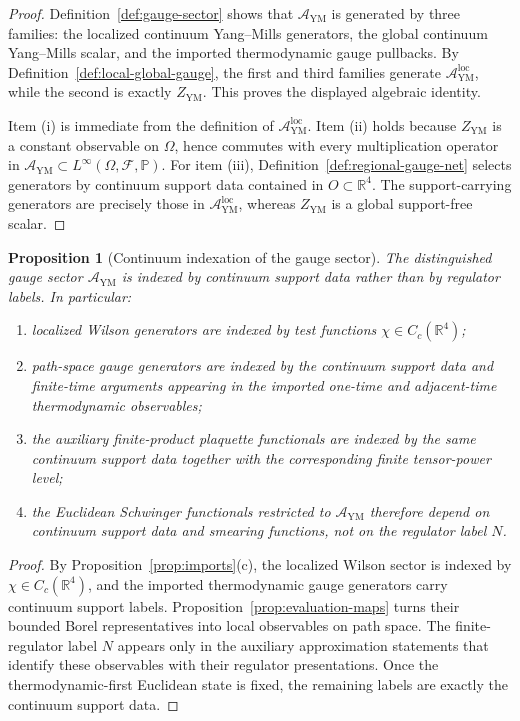 \documentclass[11pt]{article}
\newtheorem{proposition}[theorem]{Proposition}
\theoremstyle{definition}
\theoremstyle{remark}
\newcommand{\R}{\mathbb R}
\newcommand{\mcA}{\mathcal A}
\newcommand{\mcF}{\mathcal F}
\begin{document}
\begin{proof}
Definition~\ref{def:gauge-sector} shows that \(\mcA_{\mathrm{YM}}\) is generated
by three families: the localized continuum Yang--Mills generators, the global
continuum Yang--Mills scalar, and the imported thermodynamic gauge pullbacks.
By Definition~\ref{def:local-global-gauge}, the first and third families
generate \(\mcA_{\mathrm{YM}}^{\mathrm{loc}}\), while the second is exactly
\(Z_{\mathrm{YM}}\).  This proves the displayed algebraic identity.

Item \textnormal{(i)} is immediate from the definition of
\(\mcA_{\mathrm{YM}}^{\mathrm{loc}}\).  Item \textnormal{(ii)} holds because
\(Z_{\mathrm{YM}}\) is a constant observable on \(\Omega\), hence commutes with
every multiplication operator in \(\mcA_{\mathrm{YM}}\subset L^\infty(\Omega,\mcF,\mathbb P)\).
For item \textnormal{(iii)}, Definition~\ref{def:regional-gauge-net} selects
generators by continuum support data contained in \(O\subset\R^4\).  The
support-carrying generators are precisely those in
\(\mcA_{\mathrm{YM}}^{\mathrm{loc}}\), whereas \(Z_{\mathrm{YM}}\) is a global
support-free scalar.
\end{proof}

\begin{proposition}[Continuum indexation of the gauge sector]
\label{prop:continuum-indices}
The distinguished gauge sector \(\mcA_{\mathrm{YM}}\) is indexed by continuum
support data rather than by regulator labels.  In particular:
\begin{enumerate}[label=\textnormal{(\roman*)},leftmargin=1.5em]
\item localized Wilson generators are indexed by test functions
\(\chi\in C_c(\R^4)\);
\item path-space gauge generators are indexed by the continuum support data and
finite-time arguments appearing in the imported one-time and adjacent-time
thermodynamic observables;
\item the auxiliary finite-product plaquette functionals are indexed by the same
continuum support data together with the corresponding finite tensor-power
level;
\item the Euclidean Schwinger functionals restricted to \(\mcA_{\mathrm{YM}}\)
therefore depend on continuum support data and smearing functions, not on the
regulator label \(N\).
\end{enumerate}
\end{proposition}

\begin{proof}
By Proposition~\ref{prop:imports}\textnormal{(c)}, the localized Wilson sector
is indexed by \(\chi\in C_c(\R^4)\), and the imported thermodynamic gauge
generators carry continuum support labels.  Proposition~\ref{prop:evaluation-maps}
turns their bounded Borel representatives into local observables on path space.
The finite-regulator label \(N\) appears only in the auxiliary approximation
statements that identify these observables with their regulator presentations.
Once the thermodynamic-first Euclidean state is fixed, the remaining labels are
exactly the continuum support data.
\end{proof}
\end{document}

